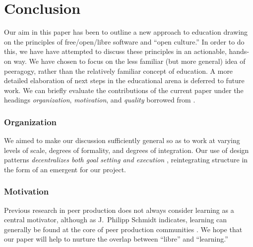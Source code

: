 \section{Conclusion}\label{sec:Conclusion}


Our aim in this paper has been to outline a new approach to education
drawing on the principles of free/open/libre software and ``open
culture.''  In order to do this, we have have attempted to discuss
these principles in an actionable, hands-on way.  We have chosen to
focus on the less familiar (but more general) idea of peeragogy,
rather than the relatively familiar concept of education.  A more
detailed elaboration of next steps in the educational arena is
deferred to future work.  We can briefly evaluate the contributions of
the current paper under the headings \emph{organization},
\emph{motivation}, and \emph{quality} borrowed from
\cite{benkler2015peer}.

\vspace{-.25\baselineskip}

\subsubsection*{Organization} 
We aimed to make our discussion sufficiently general so as to work at
varying levels of scale, degrees of formality, and degrees of
integration.  Our use of design patterns \emph{decentralizes both goal
  setting and execution} \cite{benkler2015peer}, reintegrating structure
in the form of an emergent  for our project.

\vspace{-.25\baselineskip}

\subsubsection*{Motivation}  Previous research in peer production does not always consider learning as
a central motivator, although as J.~Philipp Schmidt indicates, learning can generally be found at the core of peer production communities \cite{schmidt+commons-based+2009}.  We hope that our paper will help to nurture the overlap between ``libre'' and ``learning.''

